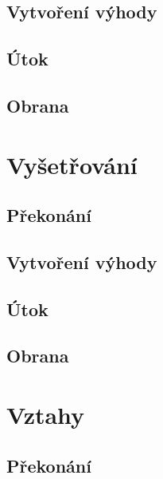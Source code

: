 \documentclass[../main.tex]{subfiles}
\begin{document}
\subsection*{Vytvoření výhody}
\label{subsec:vule-vytvoreni}
\vytvoreni

\subsection*{Útok}
\label{subsec:vule-utok}
\utok

\subsection*{Obrana}
\label{subsec:vule-obrana}
\obrana

\section{Vyšetřování}
\label{sec:vysetrovani}

\subsection*{Překonání}
\label{subsec:vysetrovani-prekonani}
\prekonani

\subsection*{Vytvoření výhody}
\label{subsec:vysetrovani-vytvoreni}
\vytvoreni

\subsection*{Útok}
\label{subsec:vysetrovani-utok}
\utok

\subsection*{Obrana}
\label{subsec:vysetrovani-obrana}
\obrana

\section{Vztahy}
\label{sec:vztahy}

\subsection*{Překonání}
\label{subsec:vztahy-prekonani}
\prekonani
\end{document}
